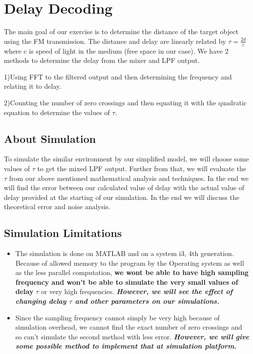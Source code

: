 \documentclass[12pt]{article}
\begin{document}
\section{Delay Decoding}
\begin{flushleft}
The main goal of our exercise is to determine the distance of the target object using the FM transmission. The distance and delay are linearly related by \textbf{$\tau = \frac{2d}{c}$ }where c is speed of light in the medium (free space in our case). We have 2 methods to determine the delay from the mixer and LPF output. 
\begin{item}
    \item 1)Using FFT to the filtered output and then determining the frequency and relating it to delay.
    \item 2)Counting the number of zero crossings and then equating it with the quadratic equation to determine the values of $\tau$.
\end{item}
\subsection*{About Simulation}
To simulate the similar environment by our simplified model, we will choose some values of $\tau$ to get the mixed LPF output. Further from that, we will evaluate the $\tau$ from our above mentioned mathematical analysis and techniques. In the end we will find the error between our calculated value of delay with the actual value of delay provided at the starting of our simulation. In the end we will discuss the theoretical error and noise analysis.
\subsection*{Simulation Limitations}
\begin{itemize}
    \item The simulation is done on MATLAB and on a system i3, 4th generation. Because of allowed memory to the program by the Operating system as well as the less parallel computation, \textbf{we wont be able to have high sampling frequency and won't be able to simulate the very small values of delay }\textit{ $\tau$} or very high frequencies.\textit{\textbf{ However, we will see the effect of changing delay $\tau$ and other parameters on our simulations.\\}}
    \item Since the sampling frequency cannot simply be very high because of simulation overhead, we cannot find the exact number of zero crossings and so can't simulate the second method with less error. \textbf{\textit{However, we will give some possible method to implement that at simulation platform.}}
\end{itemize}
\end{flushleft}
\end{document}
